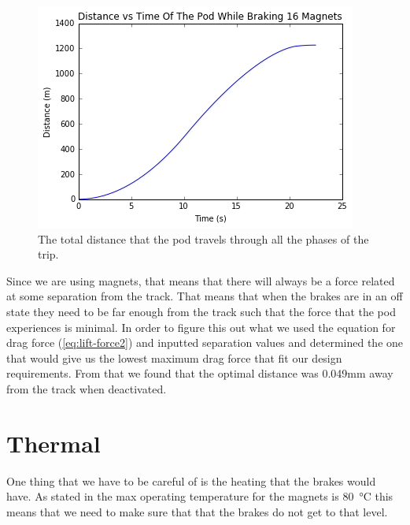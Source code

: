 \documentclass[main.tex]{subfiles}
\begin{document}
    \begin{figure}[H]
        \centering
        \includegraphics[width=\linewidth]{images/totaldistanceprofile}
        \caption{The total distance that the pod travels through all the phases of the trip.}
        \label{fig:distance-profile}
    \end{figure}
    
    Since we are using magnets, that means that there will always be a force related at some separation from the track. That means that when the brakes are in an off state they need to be far enough from the track such that the force that the pod experiences is minimal. In order to figure this out what we used the equation for drag force (\ref{eq:lift-force2}) and inputted separation values and determined the one that would give us the lowest maximum drag force that fit our design requirements. From that we found that the optimal distance was 0.049mm away from the track when deactivated.    
    
    \section{Thermal}
    One thing that we have to be careful of is the heating that the brakes would have. As stated in  the max operating temperature for the magnets is \SI{80}{\celsius} this means that we need to make sure that that the brakes do not get to that level.\\
\end{document}
